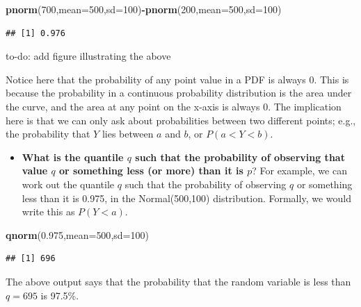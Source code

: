 \documentclass[12pt,]{krantz}
\makeatletter
\newenvironment{Shaded}{\begin{snugshade}}{\end{snugshade}}
\newcommand{\DataTypeTok}[1]{\textcolor[rgb]{0.13,0.29,0.53}{#1}}
\newcommand{\DecValTok}[1]{\textcolor[rgb]{0.00,0.00,0.81}{#1}}
\newcommand{\FloatTok}[1]{\textcolor[rgb]{0.00,0.00,0.81}{#1}}
\newcommand{\KeywordTok}[1]{\textcolor[rgb]{0.13,0.29,0.53}{\textbf{#1}}}
\newcommand{\NormalTok}[1]{#1}
\newcommand{\OperatorTok}[1]{\textcolor[rgb]{0.81,0.36,0.00}{\textbf{#1}}}
\providecommand{\tightlist}{%
  \setlength{\itemsep}{0pt}\setlength{\parskip}{0pt}}
\newenvironment{kframe}{%
\medskip{}
\setlength{\fboxsep}{.8em}
 \def\at@end@of@kframe{}%
 \ifinner\ifhmode%
  \def\at@end@of@kframe{\end{minipage}}%
  \begin{minipage}{\columnwidth}%
 \fi\fi%
 \def\FrameCommand##1{\hskip\@totalleftmargin \hskip-\fboxsep
 \colorbox{shadecolor}{##1}\hskip-\fboxsep
     \hskip-\linewidth \hskip-\@totalleftmargin \hskip\columnwidth}%
 \MakeFramed {\advance\hsize-\width
   \@totalleftmargin\z@ \linewidth\hsize
   \@setminipage}}%
 {\par\unskip\endMakeFramed%
 \at@end@of@kframe}
\newenvironment{rmdblock}[1]
  {
  \begin{itemize}
  \renewcommand{\labelitemi}{
    \raisebox{-.7\height}[0pt][0pt]{
      {\setkeys{Gin}{width=3em,keepaspectratio}\texttt{[image: images/\#1]}}
    }
  }
  \setlength{\fboxsep}{1em}
  \begin{kframe}
  \item
  }
  {
  \end{kframe}
  \end{itemize}
  }
\newenvironment{rmdnote}
  {\begin{rmdblock}{note}}
  {\end{rmdblock}}
\theoremstyle{definition}
\theoremstyle{definition}
\theoremstyle{definition}
\theoremstyle{remark}
\makeatother
\begin{document}
\begin{Shaded}
\begin{Highlighting}[]
\KeywordTok{pnorm}\NormalTok{(}\DecValTok{700}\NormalTok{,}\DataTypeTok{mean=}\DecValTok{500}\NormalTok{,}\DataTypeTok{sd=}\DecValTok{100}\NormalTok{)}\OperatorTok{-}\KeywordTok{pnorm}\NormalTok{(}\DecValTok{200}\NormalTok{,}\DataTypeTok{mean=}\DecValTok{500}\NormalTok{,}\DataTypeTok{sd=}\DecValTok{100}\NormalTok{)}
\end{Highlighting}
\end{Shaded}

\begin{verbatim}
## [1] 0.976
\end{verbatim}

\begin{rmdnote}
to-do: add figure illustrating the above
\end{rmdnote}

Notice here that the probability of any point value in a PDF is always \(0\). This is because the probability in a continuous probability distribution is the area under the curve, and the area at any point on the x-axis is always \(0\). The implication here is that we can only ask about probabilities between two different points; e.g., the probability that \(Y\) lies between \(a\) and \(b\), or \(P(a<Y<b)\).

\begin{itemize}
\tightlist
\item
  \textbf{What is the quantile \(q\) such that the probability of observing that value \(q\) or something less (or more) than it is \(p\)}? For example, we can work out the quantile \(q\) such that the probability of observing \(q\) or something less than it is 0.975, in the Normal(500,100) distribution. Formally, we would write this as \(P(Y<a)\).
\end{itemize}

\begin{Shaded}
\begin{Highlighting}[]
\KeywordTok{qnorm}\NormalTok{(}\FloatTok{0.975}\NormalTok{,}\DataTypeTok{mean=}\DecValTok{500}\NormalTok{,}\DataTypeTok{sd=}\DecValTok{100}\NormalTok{)}
\end{Highlighting}
\end{Shaded}

\begin{verbatim}
## [1] 696
\end{verbatim}

The above output says that the probability that the random variable is less than \(q=695\) is 97.5\%.
\end{document}
